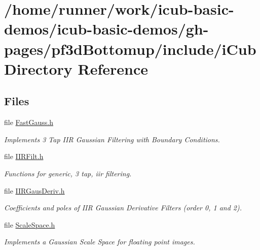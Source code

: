 \section{/home/runner/work/icub-\/basic-\/demos/icub-\/basic-\/demos/gh-\/pages/pf3d\+Bottomup/include/i\+Cub Directory Reference}
\label{dir_eb22669ebb55c4a1830d5f6f631ad207}
\subsection*{Files}
\begin{DoxyCompactItemize}
\item 
file \hyperlink{FastGauss_8h}{Fast\+Gauss.\+h}
\begin{DoxyCompactList}\small\item\em Implements 3 Tap I\+IR Gaussian Filtering with Boundary Conditions. \end{DoxyCompactList}\item 
file \hyperlink{IIRFilt_8h}{I\+I\+R\+Filt.\+h}
\begin{DoxyCompactList}\small\item\em Functions for generic, 3 tap, iir filtering. \end{DoxyCompactList}\item 
file \hyperlink{IIRGausDeriv_8h}{I\+I\+R\+Gaus\+Deriv.\+h}
\begin{DoxyCompactList}\small\item\em Coefficients and poles of I\+IR Gaussian Derivative Filters (order 0, 1 and 2). \end{DoxyCompactList}\item 
file \hyperlink{ScaleSpace_8h}{Scale\+Space.\+h}
\begin{DoxyCompactList}\small\item\em Implements a Gaussian Scale Space for floating point images. \end{DoxyCompactList}\end{DoxyCompactItemize}
